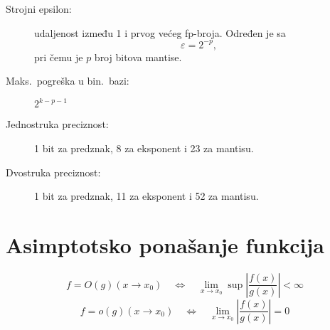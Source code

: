 \documentclass{article}
\begin{document}
\begin{description}
  \item[Strojni epsilon:] udaljenost između 1 i prvog većeg fp-broja. Određen je sa
  $$\varepsilon = 2^{-p},$$
  pri čemu je $p$ broj bitova mantise.
  \item[Maks.\ pogreška u bin.\ bazi:] $2^{k-p-1}$
  \item[Jednostruka preciznost:] 1 bit za predznak, 8 za eksponent i 23 za mantisu.
  \item[Dvostruka preciznost:] 1 bit za predznak, 11 za eksponent i 52 za mantisu.
\end{description}

\section{Asimptotsko ponašanje funkcija}
$$f = O(g) (x \rightarrow x_0) \quad \Leftrightarrow \quad \lim\limits_{x \rightarrow x_0} \sup \left | \frac{f(x)}{g(x)}\right| < \infty$$
$$f = o(g) (x \rightarrow x_0) \quad \Leftrightarrow \quad \lim\limits_{x \rightarrow x_0} \left | \frac{f(x)}{g(x)}\right| = 0$$
\end{document}
